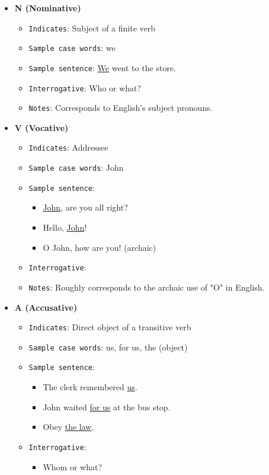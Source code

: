 \documentclass[11pt]{article}
\begin{document}
\begin{itemize}
\item \textbf{N (Nominative)}
\begin{itemize}
\item \texttt{Indicates}: Subject of a finite verb
\item \texttt{Sample case words}: we
\item \texttt{Sample sentence}: \uline{We} went to the store.
\item \texttt{Interrogative}: Who or what?
\item \texttt{Notes}: Corresponds to English's subject pronouns.
\end{itemize}
\item \textbf{V (Vocative)}
\begin{itemize}
\item \texttt{Indicates}: Addressee
\item \texttt{Sample case words}: John
\item \texttt{Sample sentence}:
\begin{itemize}
\item \uline{John}, are you all right?
\item Hello, \uline{John}!
\item O John, how are you! (archaic)
\end{itemize}
\item \texttt{Interrogative}:
\item \texttt{Notes}: Roughly corresponds to the archaic use of "O" in English.
\end{itemize}
\item \textbf{A (Accusative)}
\begin{itemize}
\item \texttt{Indicates}: Direct object of a transitive verb
\item \texttt{Sample case words}: us, for us, the (object)
\item \texttt{Sample sentence}:
\begin{itemize}
\item The clerk remembered \uline{us}.
\item John waited \uline{for us} at the bus stop.
\item Obey \uline{the law}.
\end{itemize}
\item \texttt{Interrogative}: 
\begin{itemize}
\item Whom or what?
\end{itemize}

\end{itemize}
\end{itemize}
\end{document}
